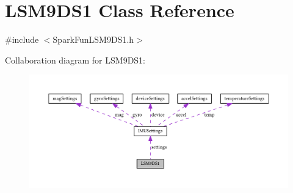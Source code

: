 \hypertarget{class_l_s_m9_d_s1}{}\section{L\+S\+M9\+D\+S1 Class Reference}
\label{class_l_s_m9_d_s1}


{\ttfamily \#include $<$Spark\+Fun\+L\+S\+M9\+D\+S1.\+h$>$}



Collaboration diagram for L\+S\+M9\+D\+S1\+:
\nopagebreak
\begin{figure}[H]
\begin{center}
\leavevmode
\includegraphics[width=350pt]{class_l_s_m9_d_s1__coll__graph}
\end{center}
\end{figure}
